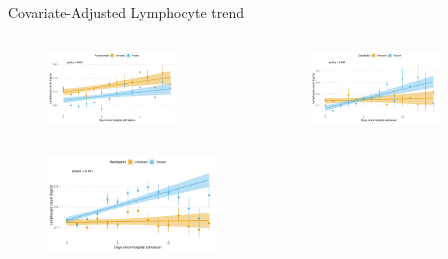 \documentclass[compress,ignorenonframetext,aspectratio=1610]{beamer}
\begin{document}
\begin{frame}{Covariate-Adjusted Lymphocyte trend}
	\begin{columns}
		\begin{figure}
			\includegraphics[width=0.8\textwidth]{figs/results/db00695_furosemide_lymphocite_progression.pdf}	
		\end{figure}

		\begin{figure}
			\includegraphics[width=0.8\textwidth]{figs/results/db00146_calcifediol_lymphocite_progression.pdf}	
		\end{figure}

	\end{columns}

	\begin{figure}
		\includegraphics[width=0.4\textwidth]{figs/results/db09258_bemiparin_lymphocite_progression.pdf}	
	\end{figure}


\end{frame}
\end{document}
